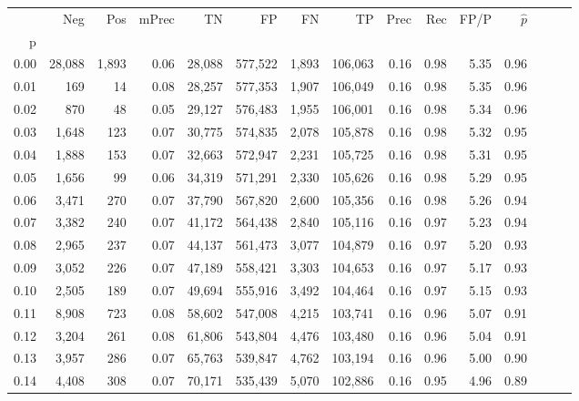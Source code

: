 \begin{tabular}{rrrrrrrrrrrrrrr}
\toprule
{} &     Neg &    Pos & mPrec &       TN &       FP &       FN &       TP &  Prec &   Rec &  FP/P & $\hat{p}$ \\
p    &         &        &       &          &          &          &          &       &       &       &           \\
\midrule
0.00 &  28,088 &  1,893 &  0.06 &   28,088 &  577,522 &    1,893 &  106,063 &  0.16 &  0.98 &  5.35 &      0.96 \\
0.01 &     169 &     14 &  0.08 &   28,257 &  577,353 &    1,907 &  106,049 &  0.16 &  0.98 &  5.35 &      0.96 \\
0.02 &     870 &     48 &  0.05 &   29,127 &  576,483 &    1,955 &  106,001 &  0.16 &  0.98 &  5.34 &      0.96 \\
0.03 &   1,648 &    123 &  0.07 &   30,775 &  574,835 &    2,078 &  105,878 &  0.16 &  0.98 &  5.32 &      0.95 \\
0.04 &   1,888 &    153 &  0.07 &   32,663 &  572,947 &    2,231 &  105,725 &  0.16 &  0.98 &  5.31 &      0.95 \\
0.05 &   1,656 &     99 &  0.06 &   34,319 &  571,291 &    2,330 &  105,626 &  0.16 &  0.98 &  5.29 &      0.95 \\
0.06 &   3,471 &    270 &  0.07 &   37,790 &  567,820 &    2,600 &  105,356 &  0.16 &  0.98 &  5.26 &      0.94 \\
0.07 &   3,382 &    240 &  0.07 &   41,172 &  564,438 &    2,840 &  105,116 &  0.16 &  0.97 &  5.23 &      0.94 \\
0.08 &   2,965 &    237 &  0.07 &   44,137 &  561,473 &    3,077 &  104,879 &  0.16 &  0.97 &  5.20 &      0.93 \\
0.09 &   3,052 &    226 &  0.07 &   47,189 &  558,421 &    3,303 &  104,653 &  0.16 &  0.97 &  5.17 &      0.93 \\
0.10 &   2,505 &    189 &  0.07 &   49,694 &  555,916 &    3,492 &  104,464 &  0.16 &  0.97 &  5.15 &      0.93 \\
0.11 &   8,908 &    723 &  0.08 &   58,602 &  547,008 &    4,215 &  103,741 &  0.16 &  0.96 &  5.07 &      0.91 \\
0.12 &   3,204 &    261 &  0.08 &   61,806 &  543,804 &    4,476 &  103,480 &  0.16 &  0.96 &  5.04 &      0.91 \\
0.13 &   3,957 &    286 &  0.07 &   65,763 &  539,847 &    4,762 &  103,194 &  0.16 &  0.96 &  5.00 &      0.90 \\
0.14 &   4,408 &    308 &  0.07 &   70,171 &  535,439 &    5,070 &  102,886 &  0.16 &  0.95 &  4.96 &      0.89 \\

\end{tabular}
